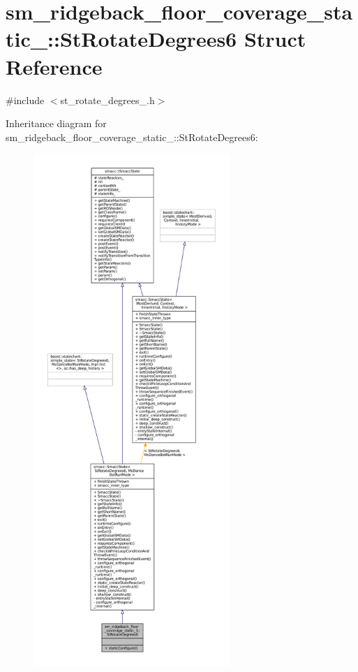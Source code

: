 \hypertarget{structsm__ridgeback__floor__coverage__static__1_1_1StRotateDegrees6}{}\section{sm\+\_\+ridgeback\+\_\+floor\+\_\+coverage\+\_\+static\+\_\+:\+:St\+Rotate\+Degrees6 Struct Reference}
\label{structsm__ridgeback__floor__coverage__static__1_1_1StRotateDegrees6}


{\ttfamily \#include $<$st\+\_\+rotate\+\_\+degrees\+\_.\+h$>$}



Inheritance diagram for sm\+\_\+ridgeback\+\_\+floor\+\_\+coverage\+\_\+static\+\_\+:\+:St\+Rotate\+Degrees6\+:
\nopagebreak
\begin{figure}[H]
\begin{center}
\leavevmode
\includegraphics[height=550pt]{structsm__ridgeback__floor__coverage__static__1_1_1StRotateDegrees6__inherit__graph}
\end{center}
\end{figure}


